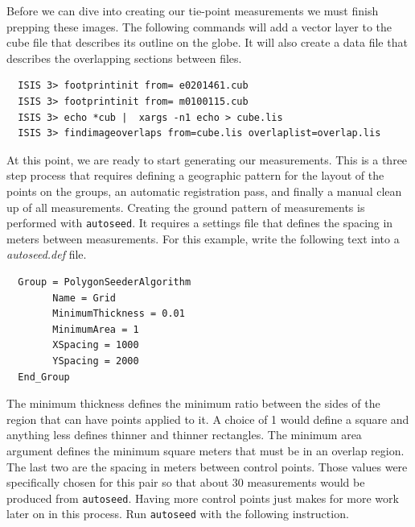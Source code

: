 Before we can dive into creating our tie-point measurements we must
finish prepping these images. The following commands will add a vector
layer to the cube file that describes its outline on the globe. It
will also create a data file that describes the overlapping sections
between files.

\begin{verbatim}
  ISIS 3> footprintinit from= e0201461.cub
  ISIS 3> footprintinit from= m0100115.cub
  ISIS 3> echo *cub |  xargs -n1 echo > cube.lis
  ISIS 3> findimageoverlaps from=cube.lis overlaplist=overlap.lis
\end{verbatim}

At this point, we are ready to start generating our measurements. This
is a three step process that requires defining a geographic pattern
for the layout of the points on the groups, an automatic registration
pass, and finally a manual clean up of all measurements. Creating the
ground pattern of measurements is performed with \texttt{autoseed}. It
requires a settings file that defines the spacing in meters between
measurements. For this example, write the following text into a
\textit{autoseed.def} file.

\begin{verbatim}
  Group = PolygonSeederAlgorithm
        Name = Grid
        MinimumThickness = 0.01
        MinimumArea = 1
        XSpacing = 1000
        YSpacing = 2000
  End_Group
\end{verbatim}

The minimum thickness defines the minimum ratio between the sides of
the region that can have points applied to it. A choice of 1 would
define a square and anything less defines thinner and thinner
rectangles. The minimum area argument defines the minimum square
meters that must be in an overlap region. The last two are the spacing
in meters between control points. Those values were specifically
chosen for this pair so that about 30 measurements would be produced
from \texttt{autoseed}. Having more control points just makes for more
work later on in this process. Run \texttt{autoseed} with the
following instruction.

